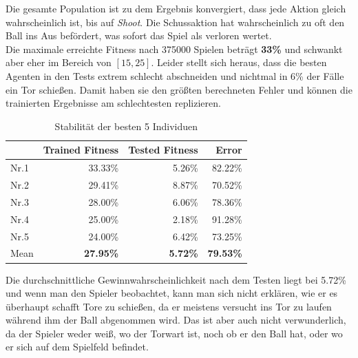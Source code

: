                 \noindent
                Die gesamte Population ist zu dem Ergebnis konvergiert, dass jede Aktion gleich wahrscheinlich ist, bis auf \textit{Shoot}. Die Schussaktion hat wahrscheinlich zu oft den Ball ins Aus befördert, was sofort das Spiel als verloren wertet.\\

                \noindent
                Die maximale erreichte Fitness nach 375000 Spielen beträgt \textbf{33\%} und schwankt aber eher im Bereich von $[15,25]$. Leider stellt sich heraus, dass die besten Agenten in den Tests extrem schlecht abschneiden und nichtmal in 6\% der Fälle ein Tor schießen. Damit haben sie den größten berechneten Fehler und können die trainierten Ergebnisse am schlechtesten replizieren.\\[3mm]

                \begin{table}[H]
                    \begin{center}
                    \begin{tabular}{ |l|r|r|r| } 
                        \hline
                        \hfill & Trained Fitness   & Tested Fitness   &          Error    \\ \hline
                          Nr.1 &          33.33\%  &          5.26\%  &          82.22\%  \\  
                          Nr.2 &          29.41\%  &          8.87\%  &          70.52\%  \\  
                          Nr.3 &          28.00\%  &          6.06\%  &          78.36\%  \\ 
                          Nr.4 &          25.00\%  &          2.18\%  &          91.28\%  \\ 
                          Nr.5 &          24.00\%  &          6.42\%  &          73.25\%  \\ \hline
                          Mean &  \textbf{27.95\%} &  \textbf{5.72\%}  & \textbf{79.53\%} \\ \hline
                    \end{tabular}
                    \end{center}
                    \caption{Stabilität der besten 5 Individuen \label{fig:actiondisttable}}
                \end{table}
                \noindent
                Die durchschnittliche Gewinnwahrscheinlichkeit nach dem Testen liegt bei 5.72\% und wenn man den Spieler beobachtet, kann man sich nicht erklären, wie er es überhaupt schafft Tore zu schießen, da er meistens versucht ins Tor zu laufen während ihm der Ball abgenommen wird. Das ist aber auch nicht verwunderlich, da der Spieler weder weiß, wo der Torwart ist, noch ob er den Ball hat, oder wo er sich auf dem Spielfeld befindet. \\

